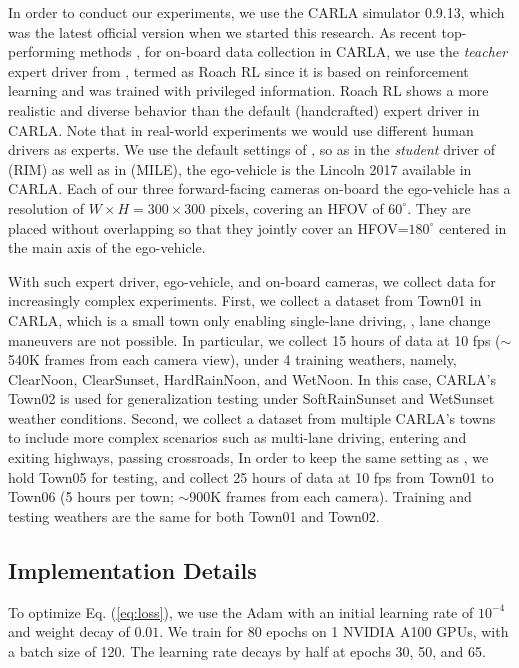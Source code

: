 In order to conduct our experiments, we use the CARLA simulator \cite{Dosovitskiy:2017} 0.9.13, which was the latest official version when we started this research. 
As recent top-performing methods \cite{Hu:2022}, for on-board data collection in CARLA, we use the \emph{teacher} expert driver from \cite{Zhang:2021}, termed as Roach RL since it is based on reinforcement learning and was trained with privileged information. 
Roach RL shows a more realistic and diverse behavior than the default (handcrafted) expert driver in CARLA. 
Note that in real-world experiments we would use different human drivers as experts. 
We use the default settings of \cite{Zhang:2021}, so as in the \emph{student} driver of \cite{Zhang:2021} (RIM) as well as in \cite{Hu:2022} (MILE), the ego-vehicle is the Lincoln 2017 available in CARLA. 
Each of our three forward-facing cameras on-board the ego-vehicle has a resolution of $W\times H=300\times300$ pixels, covering an HFOV of $60^{\circ}$. 
They are placed without overlapping so that they jointly cover an HFOV=$180^{\circ}$ centered in the main axis of the ego-vehicle. 


With such expert driver, ego-vehicle, and on-board cameras, we collect data for increasingly complex experiments. 
First, we collect a dataset from Town01 in CARLA, which is a small town only enabling single-lane driving, {\ie}, lane change maneuvers are not possible. 
In particular, we collect 15 hours of data at 10 fps ($\sim$540K frames from each camera view), under 4 training weathers, namely, ClearNoon, ClearSunset, HardRainNoon, and WetNoon. 
In this case, CARLA's Town02 is used for generalization testing under SoftRainSunset and WetSunset weather conditions. 
Second, we collect a dataset from multiple CARLA's towns to include more complex scenarios such as multi-lane driving, entering and exiting highways, passing crossroads, {\etc} In order to keep the same setting as \cite{Hu:2022}, we hold Town05 for testing, and collect 25 hours of data at 10 fps from Town01 to Town06 (5 hours per town; $\sim$900K frames from each camera). 
Training and testing weathers are the same for both Town01 and Town02. 



\subsection{Implementation Details}
To optimize Eq. (\ref{eq:loss}), we use the Adam \cite{Kingma:2015} with an initial learning rate of $10^{-4}$ and weight decay of $0.01$. 
We train for 80 epochs on 1 NVIDIA A100 GPUs, with a batch size of 120. 
The learning rate decays by half at epochs 30, 50, and 65. 

